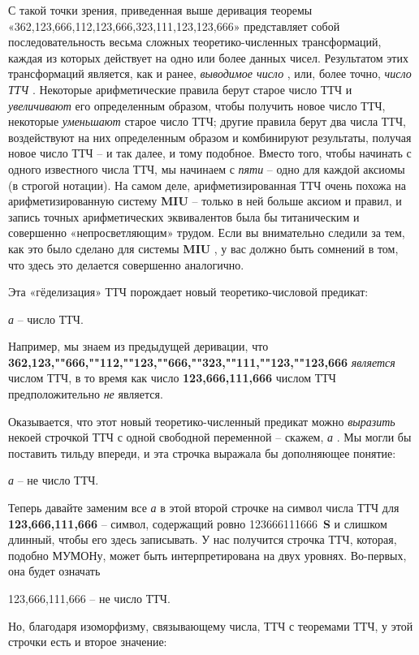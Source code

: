 \documentclass[../main.tex]{subfiles}
\begin{document}
С такой точки зрения, приведенная выше деривация теоремы «362,123,666,112,123,666,323,111,123,123,666» представляет собой последовательность весьма сложных теоретико-численных трансформаций, каждая из которых действует на одно или более данных чисел. Результатом этих трансформаций является, как и ранее, \emph{выводимое число} , или, более точно, \emph{число ТТЧ} . Некоторые арифметические правила берут старое число ТТЧ и \emph{увеличивают} его определенным образом, чтобы получить новое число ТТЧ, некоторые \emph{уменьшают} старое число ТТЧ; другие правила берут два числа ТТЧ, воздействуют на них определенным образом и комбинируют результаты, получая новое число ТТЧ \--- и так далее, и тому подобное. Вместо того, чтобы начинать с одного известного числа ТТЧ, мы начинаем с \emph{пяти} \--- одно для каждой аксиомы (в строгой нотации). На самом деле, арифметизированная ТТЧ очень похожа на арифметизированную систему \textbf{MIU} \--- только в ней больше аксиом и правил, и запись точных арифметических эквивалентов была бы титаническим и совершенно «непросветляющим» трудом. Если вы внимательно следили за тем, как это было сделано для системы \textbf{MIU} , у вас должно быть сомнений в том, что здесь это делается совершенно аналогично.

Эта «гёделизация» ТТЧ порождает новый теоретико-числовой предикат:

\emph{а} \--- число ТТЧ.

Например, мы знаем из предыдущей деривации, что \textbf{362,123,""666,""112,""123,""666,""323,""111,""123,""123,666} \emph{является} числом ТТЧ, в то время как число \textbf{123,666,111,666} числом ТТЧ предположительно \emph{не} является.

Оказывается, что этот новый теоретико-численный предикат можно \emph{выразить} некоей строчкой ТТЧ с одной свободной переменной \--- скажем, \emph{а} . Мы могли бы поставить тильду впереди, и эта строчка выражала бы дополняющее понятие:

\emph{а} \--- не число ТТЧ.

Теперь давайте заменим все \emph{а} в этой второй строчке на символ числа ТТЧ для \textbf{123,666,111,666} \--- символ, содержащий ровно \num{123 666 111 666}~\textbf{S} и слишком длинный, чтобы его здесь записывать. У нас получится строчка ТТЧ, которая, подобно МУМОНу, может быть интерпретирована на двух уровнях. Во-первых, она будет означать

123,666,111,666 \--- не число ТТЧ.

Но, благодаря изоморфизму, связывающему числа, ТТЧ с теоремами ТТЧ, у этой строчки есть и второе значение:
\end{document}
